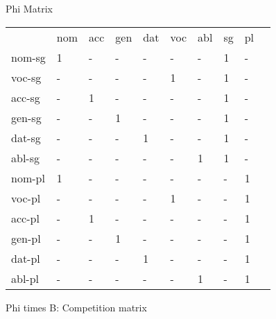 \documentclass{article}
\begin{document}
Phi Matrix 

\begin{tabular}{llllllllll}\toprule
                &nom     &acc     &gen     &dat     &voc     &abl     &sg      &pl      \\ 
nom-sg     &     1  &    -   &    -   &    -   &    -   &    -   &     1  &    -   \\ 
voc-sg     &    -   &    -   &    -   &    -   &     1  &    -   &     1  &    -   \\ 
acc-sg     &    -   &     1  &    -   &    -   &    -   &    -   &     1  &    -   \\ 
gen-sg     &    -   &    -   &     1  &    -   &    -   &    -   &     1  &    -   \\ 
dat-sg     &    -   &    -   &    -   &     1  &    -   &    -   &     1  &    -   \\ 
abl-sg     &    -   &    -   &    -   &    -   &    -   &     1  &     1  &    -   \\ 
nom-pl     &     1  &    -   &    -   &    -   &    -   &    -   &    -   &     1  \\ 
voc-pl     &    -   &    -   &    -   &    -   &     1  &    -   &    -   &     1  \\ 
acc-pl     &    -   &     1  &    -   &    -   &    -   &    -   &    -   &     1  \\ 
gen-pl     &    -   &    -   &     1  &    -   &    -   &    -   &    -   &     1  \\ 
dat-pl     &    -   &    -   &    -   &     1  &    -   &    -   &    -   &     1  \\ 
abl-pl     &    -   &    -   &    -   &    -   &    -   &     1  &    -   &     1  \\ 
\end{tabular}


Phi times B: Competition matrix 
\end{document}
